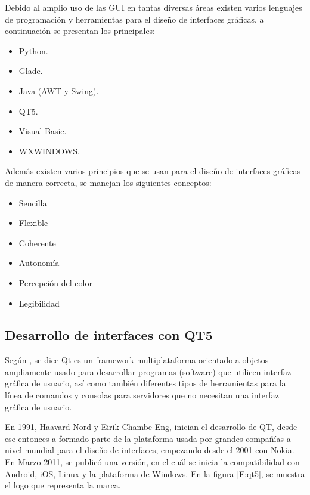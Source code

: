 Debido al amplio uso de las GUI en tantas diversas áreas existen varios lenguajes de programación y herramientas para el diseño de interfaces gráficas, a continuación se presentan los principales:

\begin{itemize}
\item Python.
\item Glade.
\item Java (AWT  y Swing).
\item QT5.
\item Visual Basic.
\item WXWINDOWS.
\end{itemize}

Además existen varios principios que se usan para el diseño de interfaces gráficas de manera correcta, se manejan los siguientes conceptos:

\begin{itemize}
\item Sencilla
\item Flexible
\item Coherente
\item Autonomía
\item Percepción del color
\item Legibilidad 
\end{itemize}

\subsection{Desarrollo de interfaces con QT5}

Según \cite{QT52018}, se dice Qt es un framework multiplataforma orientado a objetos ampliamente usado para desarrollar programas (software) que utilicen interfaz gráfica de usuario, así como también diferentes tipos de herramientas para la línea de comandos y consolas para servidores que no necesitan una interfaz gráfica de usuario.

En 1991, Haavard Nord y Eirik Chambe-Eng, inician el desarrollo de QT, desde ese entonces a formado parte de la plataforma usada por grandes compañías a nivel mundial para el diseño de interfaces, empezando desde el 2001 con Nokia. En Marzo 2011, se publicó una versión, en el cuál se inicia la compatibilidad con Android, iOS, Linux y la plataforma de Windows. En la figura \ref{F:qt5}, se muestra el logo que representa la marca. 

